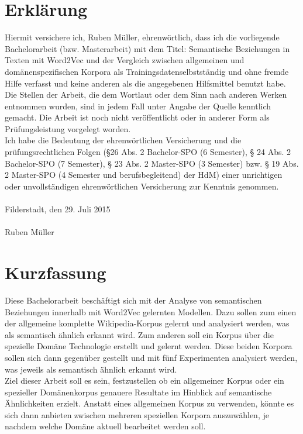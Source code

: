 \documentclass[12pt,a4paper]{report}
\begin{document}
\chapter*{Erklärung}
Hiermit versichere ich, Ruben Müller, ehrenwörtlich, dass ich die 
vorliegende Bachelorarbeit (bzw. Masterarbeit) mit dem Titel: \glqq Semantische Beziehungen in Texten mit Word2Vec und der Vergleich zwischen allgemeinen und domänenspezifischen Korpora als Trainingsdaten\grqq selbstständig und ohne fremde Hilfe verfasst und keine anderen als die angegebenen Hilfsmittel benutzt habe. Die Stellen der Arbeit, die dem Wortlaut oder dem Sinn nach anderen Werken entnommen wurden, sind in jedem Fall unter Angabe der Quelle kenntlich gemacht. Die Arbeit ist noch nicht veröffentlicht oder in anderer Form als Prüfungsleistung vorgelegt worden.\\
Ich habe die Bedeutung der ehrenwörtlichen Versicherung und die prüfungsrechtlichen Folgen (§26 Abs. 2 Bachelor-SPO (6 Semester), § 24 Abs. 2 Bachelor-SPO (7 Semester), § 23 Abs. 2 Master-SPO (3 Semester)  bzw. § 19 Abs. 2 Master-SPO (4 Semester und 
berufsbegleitend) der HdM) einer unrichtigen oder unvollständigen ehrenwörtlichen
Versicherung zur Kenntnis genommen.\\
\vspace{1em}\\
Filderstadt, den 29. Juli 2015\\
\vspace{5em}\\
Ruben Müller


\newpage
\chapter*{Kurzfassung}
Diese Bachelorarbeit beschäftigt sich mit der Analyse von semantischen Beziehungen innerhalb mit Word2Vec gelernten Modellen.
Dazu sollen zum einen der allgemeine komplette Wikipedia-Korpus gelernt und analysiert werden, was als semantisch ähnlich erkannt wird. Zum anderen soll ein Korpus über die spezielle Domäne Technologie erstellt und gelernt werden. Diese beiden Korpora sollen sich dann gegenüber gestellt und mit fünf Experimenten analysiert werden, was jeweils als semantisch ähnlich erkannt wird. 
\\Ziel dieser Arbeit soll es sein, festzustellen ob ein allgemeiner Korpus oder ein spezieller Domänenkorpus genauere Resultate im Hinblick auf semantische Ähnlichkeiten erzielt. Anstatt eines allgemeinen Korpus zu verwenden, könnte es sich dann anbieten zwischen mehreren speziellen Korpora auszuwählen, je nachdem welche Domäne aktuell bearbeitet werden soll.
\newpage
\end{document}
